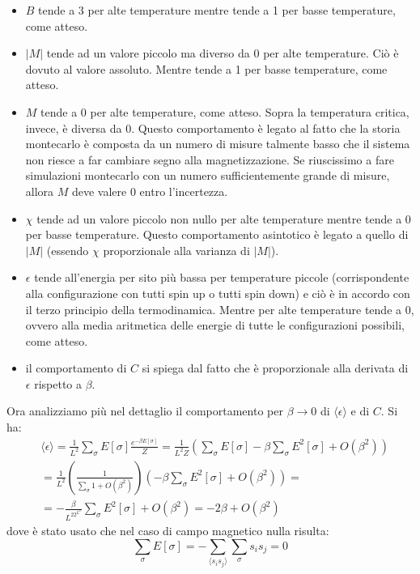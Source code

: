 \documentclass[10pt,a4paper]{article}
\begin{document}
\begin{itemize}
\item $B$ tende a 3 per alte temperature mentre tende a 1 per basse temperature, come atteso.
\item $|M|$ tende ad un valore piccolo ma diverso da 0 per alte temperature. Ciò è dovuto al valore assoluto. Mentre tende a 1 per basse temperature, come atteso.
\item $M$ tende a 0 per alte temperature, come atteso. Sopra la temperatura critica, invece, è diversa da $0$. Questo comportamento è legato al fatto che la storia montecarlo è composta da un numero di misure talmente basso che il sistema non riesce a far cambiare segno alla magnetizzazione. Se riuscissimo a fare simulazioni montecarlo con un numero sufficientemente grande di misure, allora $M$ deve valere $0$ entro l'incertezza.
\item $\chi$ tende ad un valore piccolo non nullo per alte temperature mentre tende a $0$ per basse temperature. Questo comportamento asintotico è legato a quello di $|M|$ (essendo $\chi$ proporzionale alla varianza di $|M|$).
\item $\epsilon$ tende all'energia per sito più bassa per temperature piccole (corrispondente alla configurazione con tutti spin up o tutti spin down) e ciò è in accordo con il terzo principio della termodinamica. Mentre per alte temperature tende a $0$, ovvero alla media aritmetica delle energie di tutte le configurazioni possibili, come atteso.
\item il comportamento di $C$ si spiega dal fatto che è proporzionale alla derivata di $\epsilon$ rispetto a $\beta$.

\end{itemize}
Ora analizziamo più nel dettaglio il comportamento per $\beta\rightarrow 0$  di $\langle\epsilon\rangle$ e di $C$. Si ha:
\begin{align*}
	&\langle\epsilon\rangle=\frac{1}{L^2}\sum_{\sigma}E[\sigma]\frac{e^{-\beta E[\sigma]}}{Z}=\frac{1}{L^2Z}\left(\sum_{\sigma}E[\sigma]-\beta\sum_{\sigma}E^2[\sigma]+O(\beta^2)\right)\\&=\frac{1}{L^2}\left(\frac{1}{\sum_{\sigma}1+O(\beta^2)}\right)\left(-\beta\sum_{\sigma}E^2[\sigma]+O(\beta^2)\right)=\\&=-\frac{\beta}{L^22^{L^2}}\sum_{\sigma}E^2[\sigma]+O(\beta^2)=-2\beta+O(\beta^2)
\end{align*}
dove è stato usato che nel caso di campo magnetico nulla risulta:
$$\sum_{\sigma}E[\sigma]=-\sum_{\langle s_i s_j\rangle}\sum_{\sigma}s_is_j=0$$
\end{document}
